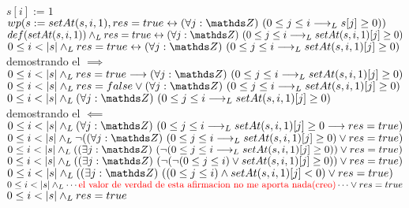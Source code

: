 \documentclass[10pt,a4paper]{article}
\begin{document}
\begin{algorithm*}
    $s[i]:=1$
    \BlankLine
    $wp(s:=setAt(s,i,1), res=true \sii \paraTodo[unalinea]{j}{\ent}{0\leq j \leq i \implicaLuego s[j]\geq 0})$
    \\$def(setAt(s,i,1))\yLuego res=true \sii \paraTodo[unalinea]{j}{\ent}{0\leq j \leq i \implicaLuego setAt(s,i,1)[j]\geq 0} $
    \\$0\leq i < |s| \yLuego res=true \sii \paraTodo[unalinea]{j}{\ent}{0\leq j \leq i \implicaLuego setAt(s,i,1)[j]\geq 0} $
    \\demostrando el $\implies$
    \\$0\leq i < |s| \yLuego res=true \implica \paraTodo[unalinea]{j}{\ent}{0\leq j \leq i \implicaLuego setAt(s,i,1)[j]\geq 0} $
    \\$0\leq i < |s| \yLuego res=false \lor \paraTodo[unalinea]{j}{\ent}{0\leq j \leq i \implicaLuego setAt(s,i,1)[j]\geq 0} $
    \\$0\leq i < |s| \yLuego \paraTodo[unalinea]{j}{\ent}{0\leq j \leq i \implicaLuego setAt(s,i,1)[j]\geq 0} $
    \\demostrando el $\impliedby$
    \\$0\leq i < |s| \yLuego \paraTodo[unalinea]{j}{\ent}{0\leq j \leq i \implicaLuego setAt(s,i,1)[j]\geq 0 \implica res=true} $
    \\$0\leq i < |s| \yLuego \lnot(\paraTodo[unalinea]{j}{\ent}{0\leq j \leq i \implicaLuego setAt(s,i,1)[j]\geq 0) \lor res=true} $
    \\$0\leq i < |s| \yLuego (\existe[unalinea]{j}{\ent}{\lnot(0\leq j \leq i \implicaLuego setAt(s,i,1)[j]\geq 0)) \lor res=true} $
    \\$0\leq i < |s| \yLuego (\existe[unalinea]{j}{\ent}{\lnot(\lnot(0\leq j \leq i) \lor setAt(s,i,1)[j]\geq 0)) \lor res=true} $
    \\$0\leq i < |s| \yLuego (\existe[unalinea]{j}{\ent}{(0\leq j \leq i) \land setAt(s,i,1)[j]<0) \lor res=true} $
    \\$0\leq i < |s| \land _L \cdots {\color{red}\text{el valor de verdad de esta afirmacion no me aporta nada(creo)}} \cdots \lor res=true $
    \\$0\leq i < |s| \land _L res=true $
    \\{\color{red}}
    \\{\color{red}}

\end{algorithm*}
\end{document}
